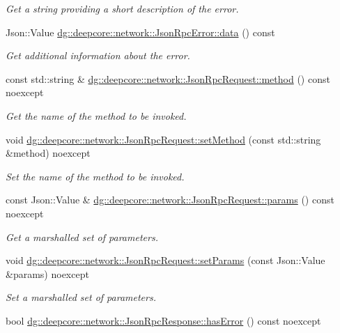 \begin{DoxyCompactItemize}
\begin{DoxyCompactList}\small\item\em Get a string providing a short description of the error. \end{DoxyCompactList}\item 
Json\+::\+Value \hyperlink{group___network_module_ga30e099cc04ea022587d643d2c93bb0e9}{dg\+::deepcore\+::network\+::\+Json\+Rpc\+Error\+::data} () const 
\begin{DoxyCompactList}\small\item\em Get additional information about the error. \end{DoxyCompactList}\item 
const std\+::string \& \hyperlink{group___network_module_gad706357297f0658e1e695cd7164291ef}{dg\+::deepcore\+::network\+::\+Json\+Rpc\+Request\+::method} () const noexcept
\begin{DoxyCompactList}\small\item\em Get the name of the method to be invoked. \end{DoxyCompactList}\item 
void \hyperlink{group___network_module_gab69275c8a35d2df9026f72f91700085e}{dg\+::deepcore\+::network\+::\+Json\+Rpc\+Request\+::set\+Method} (const std\+::string \&method) noexcept
\begin{DoxyCompactList}\small\item\em Set the name of the method to be invoked. \end{DoxyCompactList}\item 
const Json\+::\+Value \& \hyperlink{group___network_module_ga13af70a1e02c7446763e8e44f3484a53}{dg\+::deepcore\+::network\+::\+Json\+Rpc\+Request\+::params} () const noexcept
\begin{DoxyCompactList}\small\item\em Get a marshalled set of parameters. \end{DoxyCompactList}\item 
void \hyperlink{group___network_module_ga2b7b7580f1d8d287c7ef4cf54a381e1e}{dg\+::deepcore\+::network\+::\+Json\+Rpc\+Request\+::set\+Params} (const Json\+::\+Value \&params) noexcept
\begin{DoxyCompactList}\small\item\em Set a marshalled set of parameters. \end{DoxyCompactList}\item 
bool \hyperlink{group___network_module_gaf86a4b609361bdbee6d2bad26ef43c71}{dg\+::deepcore\+::network\+::\+Json\+Rpc\+Response\+::has\+Error} () const noexcept

\end{DoxyCompactItemize}
